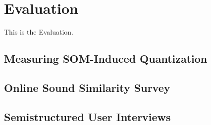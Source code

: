 
\section{Evaluation}
\label{sec:evaluation}
This is the Evaluation.

\subsection{Measuring SOM-Induced Quantization}
\label{subsec:evaluation_tech}

\subsection{Online Sound Similarity Survey}
\label{subsec:evaluation_survey}

\subsection{Semistructured User Interviews}
\label{subsec:evaluation_interviews}
